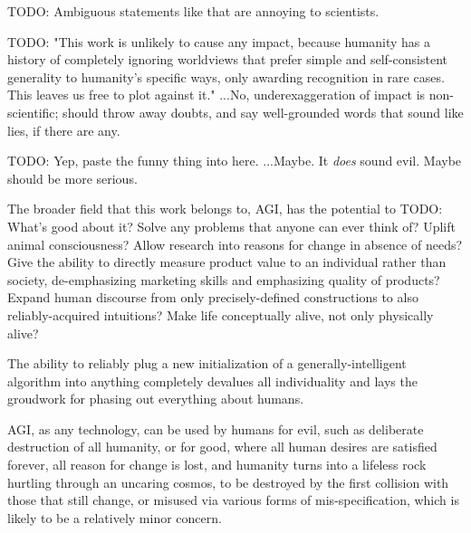 \documentclass{article}
\begin{document}
    TODO: Ambiguous statements like that are annoying to scientists.

    TODO: "This work is unlikely to cause any impact, because humanity has a history of completely ignoring worldviews that prefer simple and self-consistent generality to humanity's specific ways, only awarding recognition in rare cases. This leaves us free to plot against it." ...No, underexaggeration of impact is non-scientific; should throw away doubts, and say well-grounded words that sound like lies, if there are any.

    TODO: Yep, paste the funny thing into here. ...Maybe. It \textit{does} sound evil. Maybe should be more serious.

The broader field that this work belongs to, AGI, has the potential to TODO: What's good about it? Solve any problems that anyone can ever think of? Uplift animal consciousness? Allow research into reasons for change in absence of needs? Give the ability to directly measure product value to an individual rather than society, de-emphasizing marketing skills and emphasizing quality of products? Expand human discourse from only precisely-defined constructions to also reliably-acquired intuitions? Make life conceptually alive, not only physically alive?

The ability to reliably plug a new initialization of a generally-intelligent algorithm into anything completely devalues all individuality and lays the groudwork for phasing out everything about humans.

AGI, as any technology, can be used by humans for evil, such as deliberate destruction of all humanity, or for good, where all human desires are satisfied forever, all reason for change is lost, and humanity turns into a lifeless rock hurtling through an uncaring cosmos, to be destroyed by the first collision with those that still change, or misused via various forms of mis-specification, which is likely to be a relatively minor concern.

\printbibliography
\end{document}
